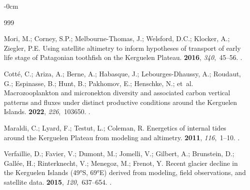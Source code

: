 \documentclass[geomatics,article,accept,pdftex,moreauthors]{Definitions/mdpi}
\begin{document}
\begin{adjustwidth}{-\extralength}{0cm}
\begin{thebibliography}{999}

Mori, M.; Corney, S.P.; Melbourne-Thomas, J.; Welsford, D.C.; Klocker, A.;
  Ziegler, P.E.
\newblock Using satellite altimetry to inform hypotheses of transport of early
  life stage of Patagonian toothfish on the Kerguelen Plateau.
 {\bf 2016}, {\em 340},~45--56.
.

Cotté, C.; Ariza, A.; Berne, A.; Habasque, J.; Lebourges-Dhaussy, A.; Roudaut,
  G.; Espinasse, B.; Hunt, B.; Pakhomov, E.; Henschke, N.;  et~al.
\newblock Macrozooplankton and micronekton diversity and associated carbon
  vertical patterns and fluxes under distinct productive conditions around the
  Kerguelen Islands.
 {\bf 2022}, {\em 226},~103650.
.

Maraldi, C.; Lyard, F.; Testut, L.; Coleman, R.
\newblock Energetics of internal tides around the Kerguelen Plateau from
  modeling and altimetry.
 {\bf 2011}, \emph{116},~1--10. %
.

Verfaillie, D.; Favier, V.; Dumont, M.; Jomelli, V.; Gilbert, A.; Brunstein,
  D.; Gallée, H.; Rinterknecht, V.; Menegoz, M.; Frenot, Y.
\newblock Recent glacier decline in the Kerguelen Islands (49°S, 69°E)
  derived from modeling, field observations, and satellite data.
 {\bf 2015}, {\em
  120},~637--654.
.


\end{thebibliography}
\end{adjustwidth}
\end{document}

